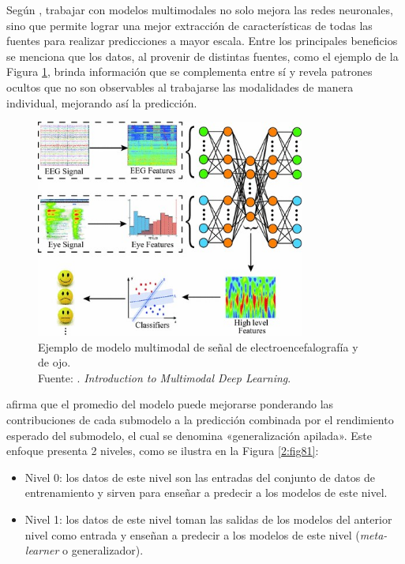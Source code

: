 Según \cite{tec_baheti2020introduction_mdl}, trabajar con modelos multimodales no solo mejora las redes neuronales, sino que permite lograr una mejor extracción de características de todas las fuentes para realizar predicciones a mayor escala. Entre los principales beneficios se menciona que los datos, al provenir de distintas fuentes, como el ejemplo de la Figura \ref{2:fig7}, brinda información que se complementa entre sí y revela patrones ocultos que no son observables al trabajarse las modalidades de manera individual, mejorando así la predicción.

\begin{figure}[!ht]
	\begin{center}
		\includegraphics[width=0.79\textwidth]{2/figures/multimodal_deep_learning_example.jpg}
		\caption[Ejemplo de modelo multimodal de señal de electroencefalografía y de ojo]{Ejemplo de modelo multimodal de señal de electroencefalografía y de ojo.\\
		Fuente: \cite{tec_baheti2020introduction_mdl}. \textit{Introduction to Multimodal Deep Learning}.}
		\label{2:fig7}
	\end{center}
\end{figure}

\cite{tec_brownlee2018stacked_models} afirma que el promedio del modelo puede mejorarse ponderando las contribuciones de cada submodelo a la predicción combinada por el rendimiento esperado del submodelo, el cual se denomina «generalización apilada». Este enfoque presenta 2 niveles, como se ilustra en la Figura \ref{2:fig81}:
\begin{itemize}
	\item Nivel 0: los datos de este nivel son las entradas del conjunto de datos de entrenamiento y sirven para enseñar a predecir a los modelos de este nivel.
	\item Nivel 1: los datos de este nivel toman las salidas de los modelos del anterior nivel como entrada y enseñan a predecir a los modelos de este nivel (\textit{meta-learner} o generalizador).
\end{itemize}

